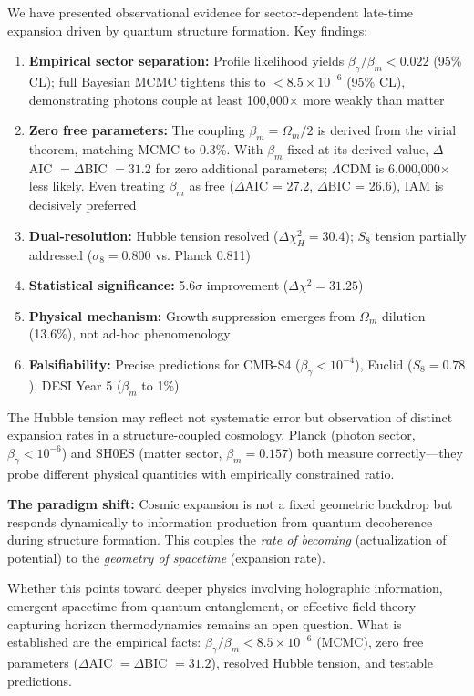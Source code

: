 \documentclass[twocolumn,superscriptaddress,prl,amsmath,amssymb]{revtex4-2}
\begin{document}
We have presented observational evidence for sector-dependent late-time expansion driven by quantum structure formation. Key findings:

\begin{enumerate}
\item \textbf{Empirical sector separation:} Profile likelihood yields $\beta_\gamma/\beta_m < 0.022$ (95\% CL); full Bayesian MCMC tightens this to $< 8.5 \times 10^{-6}$ (95\% CL), demonstrating photons couple at least 100,000$\times$ more weakly than matter
\item \textbf{Zero free parameters:} The coupling $\beta_m = \Omega_m/2$ is derived from the virial theorem, matching MCMC to 0.3\%. With $\beta_m$ fixed at its derived value, $\Delta$AIC $= \Delta$BIC $= 31.2$ for zero additional parameters; $\Lambda$CDM is 6,000,000$\times$ less likely. Even treating $\beta_m$ as free ($\Delta$AIC = 27.2, $\Delta$BIC = 26.6), IAM is decisively preferred
\item \textbf{Dual-resolution:} Hubble tension resolved ($\Delta\chi^2_H = 30.4$); $S_8$ tension partially addressed ($\sigma_8 = 0.800$ vs. Planck 0.811)
\item \textbf{Statistical significance:} 5.6$\sigma$ improvement ($\Delta\chi^2 = 31.25$)
\item \textbf{Physical mechanism:} Growth suppression emerges from $\Omega_m$ dilution (13.6\%), not ad-hoc phenomenology
\item \textbf{Falsifiability:} Precise predictions for CMB-S4 ($\beta_\gamma < 10^{-4}$), Euclid ($S_8 = 0.78$), DESI Year 5 ($\beta_m$ to 1\%)
\end{enumerate}

The Hubble tension may reflect not systematic error but observation of distinct expansion rates in a structure-coupled cosmology. Planck (photon sector, $\beta_\gamma < 10^{-6}$) and SH0ES (matter sector, $\beta_m = 0.157$) both measure correctly---they probe different physical quantities with empirically constrained ratio.

\textbf{The paradigm shift:} Cosmic expansion is not a fixed geometric backdrop but responds dynamically to information production from quantum decoherence during structure formation. This couples the \textit{rate of becoming} (actualization of potential) to the \textit{geometry of spacetime} (expansion rate).

Whether this points toward deeper physics involving holographic information, emergent spacetime from quantum entanglement, or effective field theory capturing horizon thermodynamics remains an open question. What is established are the empirical facts: $\beta_\gamma/\beta_m < 8.5 \times 10^{-6}$ (MCMC), zero free parameters ($\Delta$AIC $= \Delta$BIC $= 31.2$), resolved Hubble tension, and testable predictions.
\end{document}
